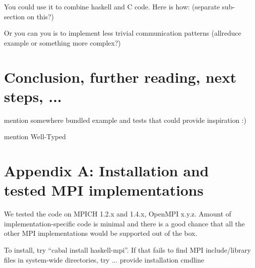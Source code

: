 \documentclass{tmr}
\begin{document}
You could use it to combine haskell and C code. Here is how: (separate sub-section on this?)

Or you can you is to implement less trivial communication patterns (allreduce example or something more complex?)


\section{Conclusion, further reading, next steps, ...}

\ToDo mention somewhere bundled example and tests that could provide inspiration :)

\ToDo mention Well-Typed

\section{Appendix A: Installation and tested MPI implementations}
We tested the code on MPICH 1.2.x and 1.4.x, OpenMPI x.y.z. Amount of implementation-specific code is minimal and there is a good chance that all the other MPI implementations would be supported out of the box.

To install, try ``cabal install haskell-mpi''. If that fails to find MPI include/library files in system-wide directories, try ...
\ToDo provide installation cmdline


\end{document}
